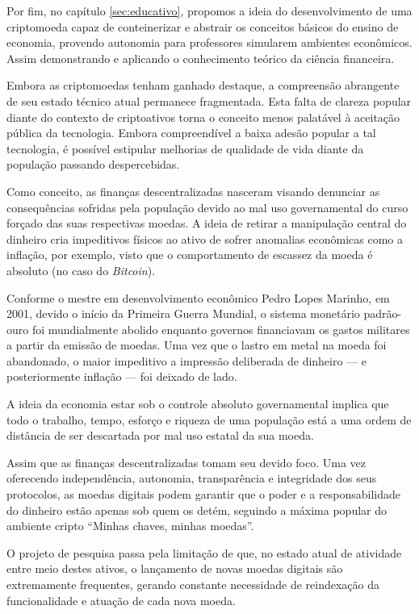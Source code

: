 \documentclass[article,12pt,oneside,a4paper,english,brazil]{unifil}
\begin{document}
\begin{Spacing}{1.5}
Por fim, no capítulo \ref*{sec:educativo}, propomos a ideia do desenvolvimento de uma criptomoeda capaz de conteinerizar e abstrair os conceitos básicos do ensino de economia, provendo autonomia para professores simularem ambientes econômicos. Assim demonstrando e aplicando o conhecimento teórico da ciência financeira.


Embora as criptomoedas tenham ganhado destaque, a compreensão abrangente de seu estado técnico atual permanece fragmentada. Esta falta de clareza popular diante do contexto de criptoativos torna o conceito menos palatável à aceitação pública da tecnologia. Embora compreendível a baixa adesão popular a tal tecnologia, é possível estipular melhorias de qualidade de vida diante da população passando despercebidas.

Como conceito, as finanças descentralizadas nasceram visando denunciar as consequências sofridas pela população devido ao mal uso governamental do curso forçado das suas respectivas moedas. A ideia de retirar a manipulação central do dinheiro cria impeditivos físicos ao ativo de sofrer anomalias econômicas como a inflação, por exemplo, visto que o comportamento de escassez da moeda é absoluto (no caso do \textit{Bitcoin}).

Conforme o mestre em desenvolvimento econômico Pedro Lopes Marinho, em 2001, devido o início da Primeira Guerra Mundial, o sistema monetário padrão-ouro foi mundialmente abolido enquanto governos financiavam os gastos militares a partir da emissão de moedas. Uma vez que o lastro em metal na moeda foi abandonado, o maior impeditivo a impressão deliberada de dinheiro — e posteriormente inflação — foi deixado de lado.

A ideia da economia estar sob o controle absoluto governamental implica que todo o trabalho, tempo, esforço e riqueza de uma população está a uma ordem de distância de ser descartada por mal uso estatal da sua moeda.

Assim que as finanças descentralizadas tomam seu devido foco. Uma vez oferecendo independência, autonomia, transparência e integridade dos seus protocolos, as moedas digitais podem garantir que o poder e a responsabilidade do dinheiro estão apenas sob quem os detém, seguindo a máxima popular do ambiente cripto ``Minhas chaves, minhas moedas''.


O projeto de pesquisa passa pela limitação de que, no estado atual de atividade entre meio destes ativos, o lançamento de novas moedas digitais são extremamente frequentes, gerando constante necessidade de reindexação da funcionalidade e atuação de cada nova moeda.


\end{Spacing}
\end{document}
